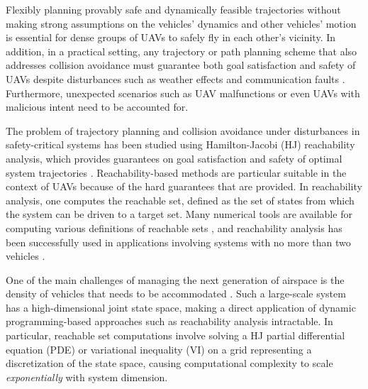 Flexibly planning provably safe and dynamically feasible trajectories without making strong assumptions on the vehicles' dynamics and other vehicles' motion is essential for dense groups of UAVs to safely fly in each other's vicinity. In addition, in a practical setting, any trajectory or path planning scheme that also addresses collision avoidance must guarantee both goal satisfaction and safety of UAVs despite disturbances such as weather effects and communication faults \cite{Kopardekar16}. Furthermore, unexpected scenarios such as UAV malfunctions or even UAVs with malicious intent need to be accounted for.

The problem of trajectory planning and collision avoidance under disturbances in safety-critical systems has been studied using Hamilton-Jacobi (HJ) reachability analysis, which provides guarantees on goal satisfaction and safety of optimal system trajectories \cite{Barron90, Mitchell05, Bokanowski10, Bokanowski11, Margellos11, Fisac15}. Reachability-based methods are particular suitable in the context of UAVs because of the hard guarantees that are provided. In reachability analysis, one computes the reachable set, defined as the set of states from which the system can be driven to a target set. Many numerical tools are available for computing various definitions of reachable sets \cite{Sethian96, Osher02, Mitchell02, Mitchell07b}, and reachability analysis has been successfully used in applications involving systems with no more than two vehicles \cite{Mitchell05, Ding08, Huang11, Bayen07}.

One of the main challenges of managing the next generation of airspace is the density of vehicles that needs to be accommodated \cite{Kopardekar16}. Such a large-scale system has a high-dimensional joint state space, making a direct application of dynamic programming-based approaches such as reachability analysis intractable. In particular, reachable set computations involve solving a HJ partial differential equation (PDE) or variational inequality (VI) on a grid representing a discretization of the state space, causing computational complexity to scale \textit{exponentially} with system dimension.
\vspace{-0.2cm}
